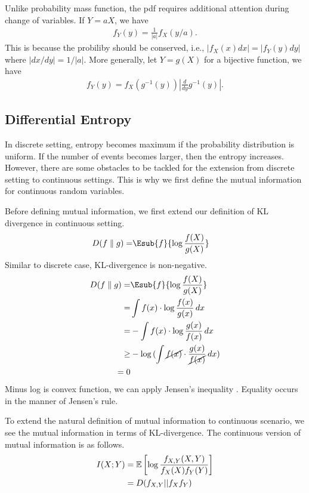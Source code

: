 \documentclass{article}
\begin{document}
Unlike probability mass function, the pdf requires additional attention during change of variables.
If $Y= aX$, we have
\begin{align}
    f_Y(y) = \frac{1}{|a|} f_X(y/a).
\end{align}
This is because the probiliby should be conserved, i.e., $|f_X(x)dx| = |f_Y(y) dy|$ where $|dx/dy| = 1/ |a|$.
More generally, let $Y = g(X)$ for a bijective function, we have
\begin{align}
    f_Y(y) = f_X(g^{-1}(y)) |\frac{d}{dy} g^{-1}(y)|.
\end{align}



\subsection{Differential Entropy}
In discrete setting, entropy becomes maximum
if the probability distribution is uniform. 
If the number of events becomes larger, then the entropy increases. 
However, there are some obstacles to be tackled for the extension from 
discrete setting to continuous settings. 
This is why we first define the mutual information for continuous random variables.

Before defining mutual information, we first extend our definition of KL divergence in continuous setting.
\begin{align}
    D(f\parallel g)=&\Esub{f}{\log{\frac{f(X)}{g(X)}}}
\end{align}
Similar to discrete case, KL-divergence is non-negative.
\begin{align}
    D(f\parallel g)=&\Esub{f}{\log{\frac{f(X)}{g(X)}}}\\
    =& \int f(x)\cdot \log{\frac{f(x)}{g(x)}}\, dx \\
    =& -\int f(x)\cdot \log{\frac{g(x)}{f(x)}}\, dx\\
    \ge & -\log{(\int \cancel{f(x)}\cdot \frac{g(x)}{\cancel{f(x)}}\, dx)}\\
    =0
\end{align}
Minus log is convex function, we can apply Jensen’s inequality .
Equality occurs in the manner of Jensen’s rule. 


To extend the natural definition of mutual information to continuous scenario, 
we see the mutual information in terms of KL-divergence. 
The continuous version of mutual information is as follows. 
\begin{equation}
\begin{split}
I(X;Y)&=\mathbb{E}\left[ \log{f_{X,Y}(X,Y) \over f_X(X)f_Y(Y)} \right] \\
      &=D(f_{X,Y}||f_Xf_Y)
\end{split}
\end{equation}
\end{document}
